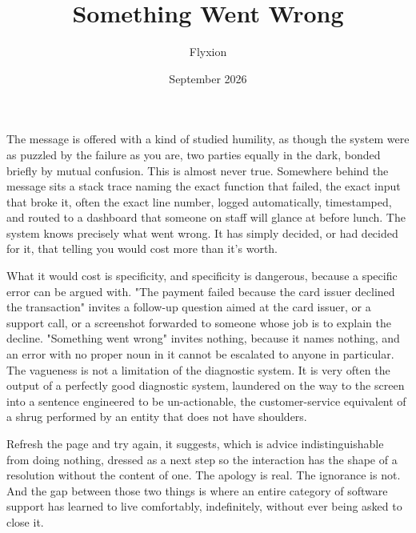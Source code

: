 \documentclass[11pt]{article}
\title{Something Went Wrong}
\author{Flyxion}
\date{September 2026}
\begin{document}
\maketitle

The message is offered with a kind of studied humility, as though the system were as puzzled by the failure as you are, two parties equally in the dark, bonded briefly by mutual confusion. This is almost never true. Somewhere behind the message sits a stack trace naming the exact function that failed, the exact input that broke it, often the exact line number, logged automatically, timestamped, and routed to a dashboard that someone on staff will glance at before lunch. The system knows precisely what went wrong. It has simply decided, or had decided for it, that telling you would cost more than it's worth.

What it would cost is specificity, and specificity is dangerous, because a specific error can be argued with. "The payment failed because the card issuer declined the transaction" invites a follow-up question aimed at the card issuer, or a support call, or a screenshot forwarded to someone whose job is to explain the decline. "Something went wrong" invites nothing, because it names nothing, and an error with no proper noun in it cannot be escalated to anyone in particular. The vagueness is not a limitation of the diagnostic system. It is very often the output of a perfectly good diagnostic system, laundered on the way to the screen into a sentence engineered to be un-actionable, the customer-service equivalent of a shrug performed by an entity that does not have shoulders.

Refresh the page and try again, it suggests, which is advice indistinguishable from doing nothing, dressed as a next step so the interaction has the shape of a resolution without the content of one. The apology is real. The ignorance is not. And the gap between those two things is where an entire category of software support has learned to live comfortably, indefinitely, without ever being asked to close it.
\end{document}
